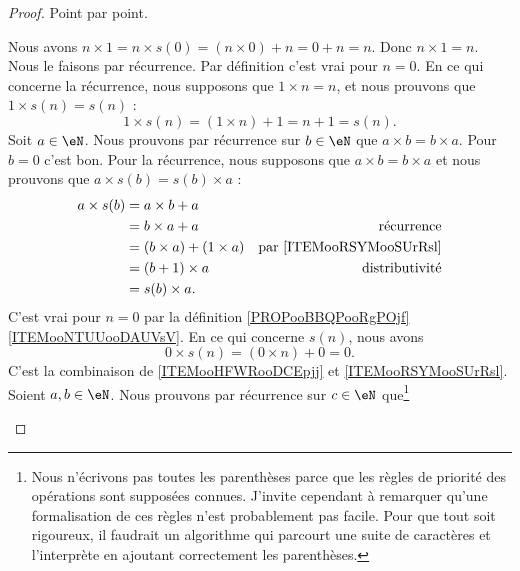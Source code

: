 \begin{proof}
	Point par point.
	\begin{subproof}
		Nous avons \( n\times 1=n\times s(0)=(n\times 0)+n=0+n=n\). Donc \( n\times 1=n\).
		Nous le faisons par récurrence. Par définition c'est vrai pour \( n=0\). En ce qui concerne la récurrence, nous supposons que \( 1\times n=n\), et nous prouvons que \( 1\times s(n)=s(n)\) :
		\begin{equation}
			1\times s(n)=(1\times n)+1=n+1=s(n).
		\end{equation}
		Soit \( a\in \eN\). Nous prouvons par récurrence sur \( b\in \eN\) que \( a\times b=b\times a\). Pour \( b=0\) c'est bon. Pour la récurrence, nous supposons que \( a\times b=b\times a\) et nous prouvons que \( a\times s(b)=s(b)\times a\) :
		\begin{subequations}
			\begin{align}
				a\times s(b) & =a\times b+a                                                   \\
				             & =b\times a+a             & \text{récurrence}                   \\
				             & =(b\times a)+(1\times a) & \text{par \ref{ITEMooRSYMooSUrRsl}} \\
				             & =(b+1)\times a           & \text{distributivité}               \\
				             & =s(b)\times a.
			\end{align}
		\end{subequations}
		C'est vrai pour \( n=0\) par la définition \ref{PROPooBBQPooRgPOjf}\ref{ITEMooNTUUooDAUVsV}. En ce qui concerne \( s(n)\), nous avons
		\begin{equation}
			0\times s(n)=(0\times n)+0=0.
		\end{equation}
		C'est la combinaison de \ref{ITEMooHFWRooDCEpjj} et \ref{ITEMooRSYMooSUrRsl}.
		Soient \( a,b\in \eN\). Nous prouvons par récurrence sur \( c\in \eN\) que\footnote{Nous n'écrivons pas toutes les parenthèses parce que les règles de priorité des opérations sont supposées connues. J'invite cependant  à remarquer qu'une formalisation de ces règles n'est probablement pas facile. Pour que tout soit rigoureux, il faudrait un algorithme qui parcourt une suite de caractères et l'interprète en ajoutant correctement les parenthèses.}

\end{subproof}
\end{proof}
